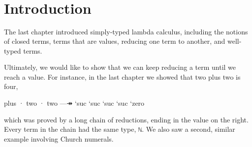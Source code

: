 \begin{fence}
\begin{code}
\AgdaSpace{}%
\AgdaSpace{}%
\AgdaSpace{}%
\AgdaSymbol{(}\AgdaSymbol{;}\AgdaSpace{}%
\AgdaSymbol{;}\AgdaSpace{}%
\AgdaSymbol{)}\<%
\\
\>[0]\AgdaSpace{}%
\AgdaSpace{}%
\AgdaSpace{}%
\AgdaSpace{}%
\AgdaSymbol{(}\AgdaSymbol{;}\AgdaSpace{}%
\AgdaSymbol{;}\AgdaSpace{}%
\AgdaSymbol{;}\AgdaSpace{}%
\AgdaSymbol{)}\<%
\\
\>[0]\AgdaSpace{}%
\AgdaSpace{}%
\AgdaSpace{}%
\AgdaSpace{}%
\AgdaSymbol{(}\AgdaSymbol{)}\<%
\\
\>[0]\AgdaSpace{}%
\AgdaSpace{}%
\<%
\\
\>[0]\AgdaSpace{}%
\AgdaSpace{}%
\<%
\end{code}
\end{fence}

\hypertarget{introduction}{%
\section{Introduction}\label{introduction}}

The last chapter introduced simply-typed lambda calculus, including the
notions of closed terms, terms that are values, reducing one term to
another, and well-typed terms.

Ultimately, we would like to show that we can keep reducing a term until
we reach a value. For instance, in the last chapter we showed that two
plus two is four,

\begin{myDisplay}
plus · two · two  —↠  `suc `suc `suc `suc `zero
\end{myDisplay}

which was proved by a long chain of reductions, ending in the value on
the right. Every term in the chain had the same type,
\texttt{\textasciigrave{}ℕ}. We also saw a second, similar example
involving Church numerals.

